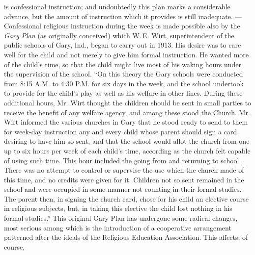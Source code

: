 is confessional instruction; and undoubtedly this plan marks a considerable advance, but the amount of instruction which it provides is still inadequate. — Confessional religious instruction during the week is made possible also by the \emph{Gary Plan} (as originally conceived) which W.\,E. Wirt, superintendent of the public schools of Gary, Ind., began to carry out in 1913. His desire was to care well for the child and not merely to give him formal instruction. He wanted more of the child’s time, so that the child might live most of his waking hours under the supervision of the school. “On this theory the Gary schools were conducted from 8:15 A.M. to 4:30 P.M. for six days in the week, and the school undertook to provide for the child’s play as well as his welfare in other lines. During these additional hours, Mr. Wirt thought the children should be sent in small parties to receive the benefit of any welfare agency, and among these stood the Church. Mr. Wirt informed the various churches in Gary that he stood ready to send to them for week-day instruction any and every child whose parent should sign a card desiring to have him so sent, and that the school would allot the church from one up to six hours per week of each child’s time, according as the church felt capable of using such time. This hour included the going from and returning to school. There was no attempt to control or supervise the use which the church made of this time, and no credits were given for it. Children not so sent remained in the school and were occupied in some manner not counting in their formal studies. The parent then, in signing the church card, chose for his child an elective course in religious subjects, but, in taking this elective the child lost nothing in his formal studies.” This original Gary Plan has undergone some radical changes, most serious among which is the introduction of a cooperative arrangement patterned after the ideals of the Religious Education Association. This affects, of course,
